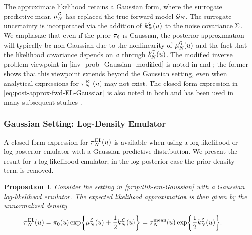 \documentclass[12pt]{article}
\newtheorem{prop}{Proposition}
\begin{document}
The approximate likelihood retains a Gaussian form, where the surrogate predictive mean
$\emMean[\Ndesign]{\fwd}$ has replaced the true forward model $\fwdEm[\Ndesign]$. The surrogate uncertainty
is incorporated via the addition of $\emKer[\Ndesign]{\fwd}(\Par)$ to the noise covariance $\likPar$.
We emphasize that even if the prior $\priorDens$ is Gaussian, the posterior approximation will typically be non-Gaussian
due to the nonlinearity of $\emMean[\Ndesign]{\fwd}(\Par)$ and the fact that the likelihood covariance depends on 
$\Par$ through $\emKer[\Ndesign]{\fwd}(\Par)$. The modified inverse problem viewpoint 
in \cref{inv_prob_Gaussian_modified} is noted in \citet{SinsbeckNowak} and \citet{StuartTeck1}; the former shows that
this viewpoint extends beyond the Gaussian setting, even when analytical expressions for $\postApproxMarg[\Ndesign](\Par) $ 
may not exist.
The closed-form expression in \cref{eq:post-approx-fwd-EL-Gaussian} is also noted in both
\citet{SinsbeckNowak, StuartTeck1} and has been used in many subsequent studies 
\citep{VehtariParallelGP,weightedIVAR,StuartTeck2,GP_PDE_priors,CES,idealizedGCM,
villani2024posteriorsamplingadaptivegaussian,hydrologicalModel}. 

\subsubsection{Gaussian Setting: Log-Density Emulator}
A closed form expression for $\postApproxMarg[\Ndesign](\Par)$ is available when using a log-likelihood
or log-posterior emulator with a Gaussian predictive distribution. We present the result for a log-likelihood 
emulator; in the log-posterior case the prior density term is removed.

\begin{prop} \label{prop:post-approx-llik-EL-Gaussian}
Consider the setting in \cref{prop:llik-em-Gaussian} with a Gaussian log-likelihood emulator. The 
expected likelihood approximation is then given by the unnormalized density 
\begin{align}
\postApproxMarg[\Ndesign](\Par) 
&= \priorDens(\Par) \Exp{\emMean[\Ndesign]{\llik}(\Par) + \frac{1}{2}\emKer[\Ndesign]{\llik}(\Par)}
= \postApproxMean(\Par) \Exp{\frac{1}{2}\emKer[\Ndesign]{\llik}(\Par)}. \label{eq:post-approx-llik-EL-Gaussian}
\end{align}
\end{prop}
\end{document}
